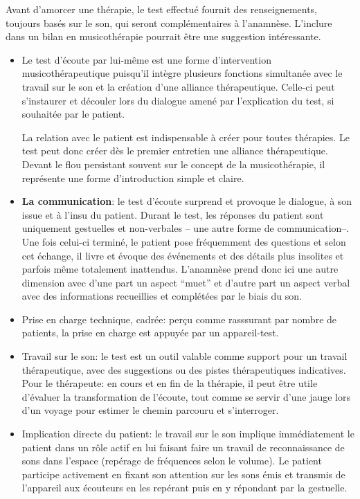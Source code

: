   Avant d'amorcer une thérapie, le test effectué fournit des
  renseignements, toujours basés sur le son, qui seront
  complémentaires à l'anamnèse. L'inclure dans un bilan en
  musicothérapie pourrait être une suggestion intéressante.
  \begin{itemize}
     \item Le test d'écoute par lui-même est  une forme d'intervention
   musicothérapeutique puisqu'il intègre plusieurs fonctions simultanée avec le
   travail sur le son et la création d'une alliance thérapeutique.
 Celle-ci  peut
   s'instaurer et découler lors du
   dialogue amené par l'explication du test, si souhaitée par le patient.
 
La relation avec le patient est indispensable à créer pour toutes
thérapies. Le test peut donc créer dès le premier entretien une alliance
thérapeutique.
Devant le flou persistant souvent sur le concept de la
musicothérapie, il représente une forme
d'introduction simple et claire.  

  \item \textbf{La communication}: le test d'écoute surprend et
    provoque le dialogue, à son issue et à l'insu du patient. 
  Durant le test, les réponses du patient sont uniquement 
    gestuelles et 
    non-verbales -- une autre forme de communication--.
    Une fois celui-ci terminé,
 le patient pose fréquemment des questions et selon
 cet échange, il livre et évoque des événements et des détails plus
 insolites et parfois même totalement inattendus.
L'anamnèse prend
 donc ici une autre  dimension avec d'une part un aspect ``muet'' et
 d'autre part un aspect verbal avec des informations recueillies et complétées
 par le biais du son.
\item Prise en charge technique, cadrée: perçu comme  rasssurant  par
  nombre de patients, la prise en charge est appuyée par un appareil-test.
 \item Travail sur le son: le test est un outil valable comme
 support pour un travail thérapeutique, avec
 des suggestions ou des pistes thérapeutiques indicatives.
 Pour le thérapeute: en cours et en fin de la thérapie, il peut
  être utile d'évaluer la transformation de l'écoute, tout
comme se servir d'une jauge  lors d'un voyage pour estimer le chemin
parcouru et s'interroger.
\item Implication directe du
     patient: le travail sur le son implique immédiatement le patient
 dans un rôle actif en lui faisant faire un travail de reconnaissance de sons dans
 l'espace (repérage de fréquences selon le volume). Le patient
 participe activement en fixant son attention sur les
 sons émis et transmis de l'appareil aux écouteurs en les repérant
  puis en y
  répondant par la gestuelle.
  

\end{itemize}
